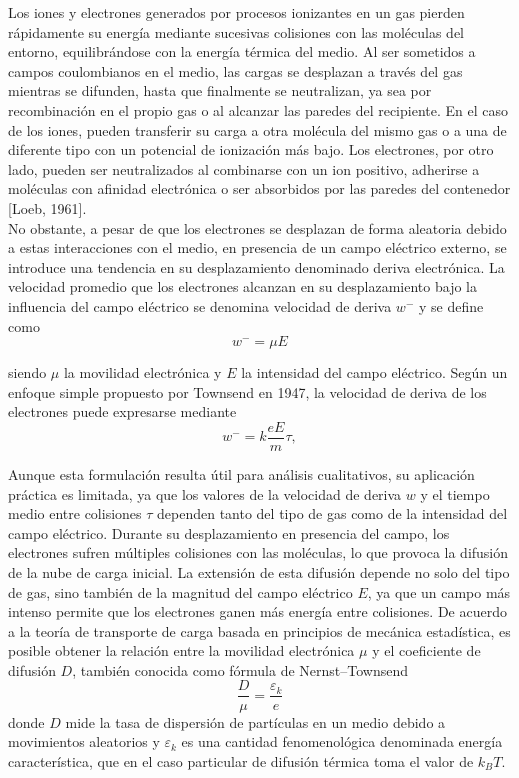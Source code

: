 \documentclass{article}
\begin{document}
\noindent Los iones y electrones generados por procesos ionizantes en un gas pierden rápidamente su energía mediante sucesivas colisiones con las moléculas del entorno, equilibrándose con la energía térmica del medio. Al ser sometidos a campos coulombianos en el medio, las cargas se desplazan a través del gas mientras se difunden, hasta que finalmente se neutralizan, ya sea por recombinación en el propio gas o al alcanzar las paredes del recipiente. En el caso de los iones, pueden transferir su carga a otra molécula del mismo gas o a una de diferente tipo con un potencial de ionización más bajo. Los electrones, por otro lado, pueden ser neutralizados al combinarse con un ion positivo, adherirse a moléculas con afinidad electrónica o ser absorbidos por las paredes del contenedor [Loeb, 1961].\\

\noindent No obstante, a pesar de que los electrones se desplazan de forma aleatoria debido a estas interacciones con el medio, en presencia de un campo eléctrico externo, se introduce una tendencia en su desplazamiento denominado deriva electrónica. La velocidad promedio que los electrones alcanzan en su desplazamiento bajo la influencia del campo eléctrico se denomina velocidad de deriva $w^{-}$ y se define como 
\begin{equation}
    w^{-} = \mu E
\end{equation}

\noindent siendo $\mu$ la movilidad electrónica y $E$ la intensidad del campo eléctrico. Según un enfoque simple propuesto por Townsend en 1947, la velocidad de deriva de los electrones puede expresarse mediante 
\begin{equation}
    w^{-}=k \frac{e E}{m} \tau,
\end{equation}

\noindent Aunque esta formulación resulta útil para análisis cualitativos, su aplicación práctica es limitada, ya que los valores de la velocidad de deriva $w$ y el tiempo medio entre colisiones $\tau$ dependen tanto del tipo de gas como de la intensidad del campo eléctrico. Durante su desplazamiento en presencia del campo, los electrones sufren múltiples colisiones con las moléculas, lo que provoca la difusión de la nube de carga inicial. La extensión de esta difusión depende no solo del tipo de gas, sino también de la magnitud del campo eléctrico $E$, ya que un campo más intenso permite que los electrones ganen más energía entre colisiones. De acuerdo a la teoría de transporte de carga basada en principios de mecánica estadística, es posible obtener la relación entre la movilidad electrónica $\mu$ y el coeficiente de difusión $D$, también conocida como fórmula de Nernst–Townsend
\begin{equation}
    \frac{D}{\mu}=\frac{\varepsilon_k}{e}
\end{equation}
\noindent donde $D$ mide la tasa de dispersión de partículas en un medio debido a movimientos aleatorios y $\varepsilon_k$ es una cantidad fenomenológica denominada energía característica, que en el caso particular de difusión térmica toma el valor de $k_{B} T$.\\
\end{document}
